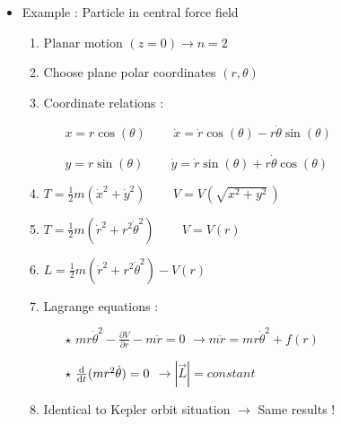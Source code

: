\Tr
\begin{itemize}
\item Example : Particle in central force field
\begin{enumerate}
\item Planar motion $(z=0) \rightarrow n=2$
\item Choose plane polar coordinates $(r,\theta)$
\item Coordinate relations :
\begin{itemize}
\item[] $x=r\cos(\theta)$ ~~~
        $\dot{x}=\dot{r}\cos(\theta)-r\dot{\theta}\sin(\theta)$
\item[] $y=r\sin(\theta)$ ~~~
        $\dot{y}=\dot{r}\sin(\theta)+r\dot{\theta}\cos(\theta)$
\end{itemize}
\item $T=\frac{1}{2}m(\dot{x}^{2}+\dot{y}^{2})$ ~~~ $V=V(\sqrt{x^{2}+y^{2}}\,)$
\item $T=\frac{1}{2}m(\dot{r}^{2}+r^{2}\dot{\theta}^{2})$ ~~~ $V=V(r)$
\item $L=\frac{1}{2}m(\dot{r}^{2}+r^{2}\dot{\theta}^{2})-V(r)$
\item Lagrange equations :
\begin{itemize}
\item[$\star$] $mr\dot{\theta}^{2}-\frac{\partial V}{\partial r}-m\ddot{r}=0$
               $\rightarrow m\ddot{r}=mr\dot{\theta}^{2}+f(r)$
\item[$\star$] $\frac{\rm d}{{\rm d}t}(mr^{2}\dot{\theta})=0$
               $\rightarrow |\vec{L}|=constant$
\end{itemize}
\item Identical to Kepler orbit situation $\rightarrow$ Same results !
\end{enumerate}
\end{itemize}

